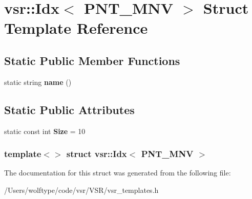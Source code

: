 \hypertarget{structvsr_1_1_idx_3_01_p_n_t___m_n_v_01_4}{\section{vsr\-:\-:Idx$<$ P\-N\-T\-\_\-\-M\-N\-V $>$ Struct Template Reference}
\label{structvsr_1_1_idx_3_01_p_n_t___m_n_v_01_4}
}
\subsection*{Static Public Member Functions}
\begin{DoxyCompactItemize}
\item 
\hypertarget{structvsr_1_1_idx_3_01_p_n_t___m_n_v_01_4_a0064e40babae55a0c56e39f20970fc20}{static string {\bfseries name} ()}\label{structvsr_1_1_idx_3_01_p_n_t___m_n_v_01_4_a0064e40babae55a0c56e39f20970fc20}

\end{DoxyCompactItemize}
\subsection*{Static Public Attributes}
\begin{DoxyCompactItemize}
\item 
\hypertarget{structvsr_1_1_idx_3_01_p_n_t___m_n_v_01_4_add279627762e2ba78c55cee89a4c7581}{static const int {\bfseries Size} = 10}\label{structvsr_1_1_idx_3_01_p_n_t___m_n_v_01_4_add279627762e2ba78c55cee89a4c7581}

\end{DoxyCompactItemize}
\subsubsection*{template$<$$>$ struct vsr\-::\-Idx$<$ P\-N\-T\-\_\-\-M\-N\-V $>$}



The documentation for this struct was generated from the following file\-:\begin{DoxyCompactItemize}
\item 
/\-Users/wolftype/code/vsr/\-V\-S\-R/vsr\-\_\-templates.\-h\end{DoxyCompactItemize}
